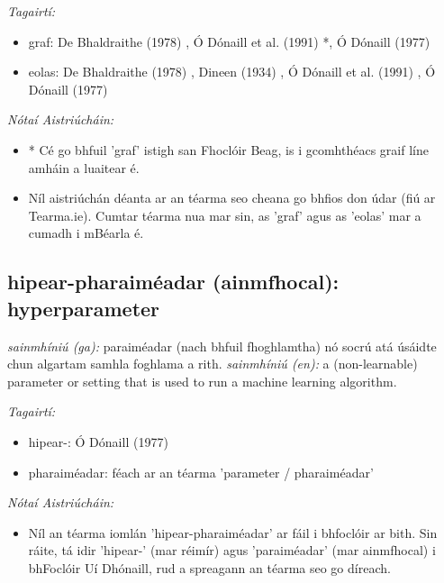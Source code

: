 \documentclass{article}
\begin{document}
 \noindent \textit{Tagairtí:}
\begin{itemize}
	\item graf: De Bhaldraithe (1978) \cite{de-bhaldraithe}, Ó Dónaill et al. (1991) \cite{focloir-beag}*, Ó Dónaill (1977) \cite{odonaill}
	\item eolas: De Bhaldraithe (1978) \cite{de-bhaldraithe}, Dineen (1934) \cite{dineen}, Ó Dónaill et al. (1991) \cite{focloir-beag}, Ó Dónaill (1977) \cite{odonaill}
\end{itemize}

 \noindent \textit{Nótaí Aistriúcháin:}
\begin{itemize}
	\item * Cé go bhfuil 'graf' istigh san Fhoclóir Beag, is i gcomhthéacs graif líne amháin a luaitear é.
	\item Níl aistriúchán déanta ar an téarma seo cheana go bhfios don údar (fiú ar Tearma.ie). Cumtar téarma nua mar sin, as 'graf' agus as 'eolas' mar a cumadh i mBéarla é.
\end{itemize}


\subsection*{hipear-pharaiméadar (ainmfhocal): hyperparameter} 
 \noindent \textit{sainmhíniú (ga):} paraiméadar (nach bhfuil fhoghlamtha) nó socrú atá úsáidte chun algartam samhla foghlama a rith.
\newline\newline
 \noindent \textit{sainmhíniú (en):} a (non-learnable) parameter or setting that is used to run a machine learning algorithm.
\newline

 \noindent \textit{Tagairtí:}
\begin{itemize}
	\item hipear-: Ó Dónaill (1977) \cite{odonaill}
	\item pharaiméadar: féach ar an téarma 'parameter / pharaiméadar'
\end{itemize}

 \noindent \textit{Nótaí Aistriúcháin:}
\begin{itemize}
	\item Níl an téarma iomlán 'hipear-pharaiméadar' ar fáil i bhfoclóir ar bith. Sin ráite, tá idir 'hipear-' (mar réimír) agus 'paraiméadar' (mar ainmfhocal) i bhFoclóir Uí Dhónaill, rud a spreagann an téarma seo go díreach.
\end{itemize}
\end{document}
